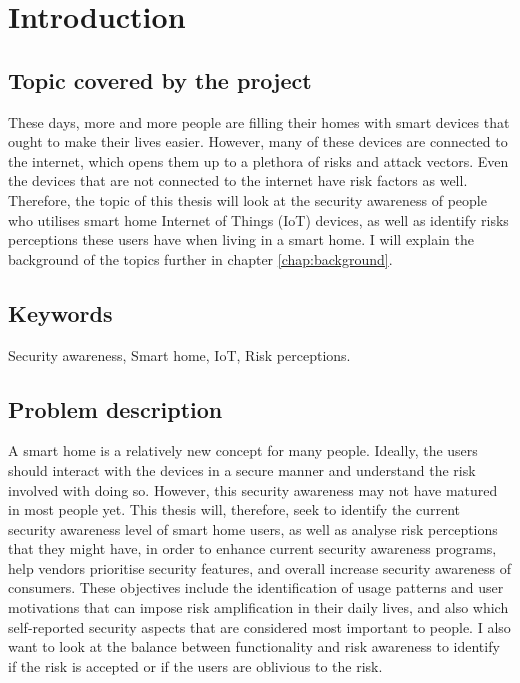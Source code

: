 \chapter{Introduction}
\label{chap:intro}

\section{Topic covered by the project}
These days, more and more people are filling their homes with smart devices that ought to make their lives easier. However, many of these devices are connected to the internet, which opens them up to a plethora of risks and attack vectors. Even the devices that are not connected to the internet have risk factors as well. Therefore, the topic of this thesis will look at the security awareness of people who utilises smart home Internet of Things (IoT) devices, as well as identify risks perceptions these users have when living in a smart home. I will explain the background of the topics further in chapter \ref{chap:background}. 

\section{Keywords}
Security awareness, Smart home, IoT, Risk perceptions. 

\section{Problem description}
A smart home is a relatively new concept for many people. Ideally, the users should interact with the devices in a secure manner and understand the risk involved with doing so. However, this security awareness may not have matured in most people yet. This thesis will, therefore, seek to identify the current security awareness level of smart home users, as well as analyse risk perceptions that they might have, in order to enhance current security awareness programs, help vendors prioritise security features, and overall increase security awareness of consumers. These objectives include the identification of usage patterns and user motivations that can impose risk amplification in their daily lives, and also which self-reported security aspects that are considered most important to people. I also want to look at the balance between functionality and risk awareness to identify if the risk is accepted or if the users are oblivious to the risk. 

